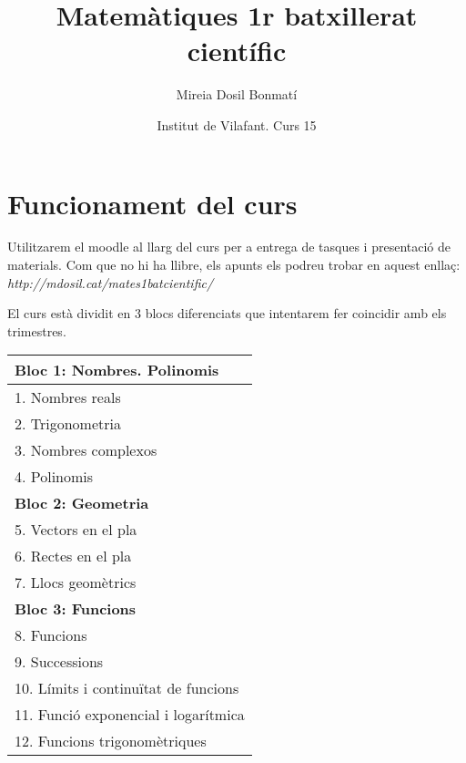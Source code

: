 \documentclass{article}
\title{Matemàtiques 1r batxillerat científic}
\author{Mireia Dosil Bonmatí}
\author{Institut de Vilafant. Curs 15}
\newlength{\rulelength}
\begin{document}
\thispagestyle{empty}
\setlength{\unitlength}{1in}

\makeatletter
\vspace*{3ex}
\par\noindent{\hspace*{-1.5em}\LARGE\bf \@title}
\vspace*{-1.2ex}
\par\noindent{{\hspace*{-1.5em}\rule{\rulelength}{1.05pt}}}
\vspace*{-.5ex}
\par\noindent{\hspace*{-1.5em}\large \@author}
\vspace*{5ex}
\makeatother

\section{Funcionament del curs}

Utilitzarem el moodle al llarg del curs per a entrega de tasques i presentació de materials. Com que no hi ha llibre, els apunts els podreu trobar en aquest enllaç: \emph{http://mdosil.cat/mates1batcientific/}

El curs està dividit en 3 blocs diferenciats que intentarem fer coincidir amb els trimestres. 




\begin{center}
	\begin{tabular}{ | l |}
		\hline
		\textbf{Bloc 1: Nombres. Polinomis}   \\ 
		\hline
		1. Nombres reals \\
		2. Trigonometria\\
		3. Nombres complexos\\
		4. Polinomis\\
		\hline
		\hline
		\textbf{Bloc 2: Geometria}   \\ 
		\hline
		5. Vectors en el pla \\
		6. Rectes en el pla\\
		7. Llocs geomètrics\\
		\hline
		\hline
		\textbf{Bloc 3: Funcions}   \\ 
		\hline
		8. Funcions \\
		9. Successions\\
		10. Límits i continuïtat de funcions\\
		11. Funció exponencial i logarítmica\\
		12. Funcions trigonomètriques\\
		\hline
		
	\end{tabular}
\end{center}
\end{document}
